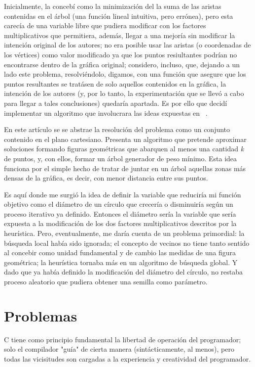 \documentclass[a4paper]{report}
\begin{document}
  Inicialmente, la conceb\'i como la minimizaci\'on del la suma de las aristas contenidas en el
  \'arbol (una funci\'on lineal intuitiva, pero err\'onea), pero esta carec\'ia de una variable
  libre que pudiera modificar con los factores multiplicativos que permitiera, adem\'as, llegar
  a una mejor\'ia sin modificar la intenci\'on original de los autores; no era posible usar las
  aristas (o coordenadas de los v\'ertices) como valor modificado ya que los puntos resiultantes
  podr\'ian no encontrarse dentro de la gr\'afica original; considero, incluso, que, dejando a
  un lado este problema, resolvi\'endolo, digamos, con una funci\'on que asegure que los puntos
  resultantes se trat\'asen de solo aquellos contenidos en la gr\'afica, la intenci\'on de los
  autores (y, por lo tanto, la experimentaci\'on que se llev\'o a cabo para llegar a tales
  conclusiones) quedar\'ia apartada. Es por ello que decid\'i implementar un algoritmo que
  involucrara las ideas expuestas en ~\cite{ravi}.

  En este art\'iculo se se abstrae la resoluci\'on del problema como un conjunto contenido en el
  plano cartesiano. Presenta un algoritmo que pretende aproximar soluciones formando figuras geom\'etricas
  que abarquen al menos una cantidad \textit{k} de puntos, y, con ellos, formar un \'arbol generador
  de peso m\'inimo. Esta idea funciona por el simple hecho de tratar de juntar en un \'arbol aquellas zonas
  m\'as densas de la gr\'afica, es decir, con menor distancia entre sus puntos.

  Es aqu\'i donde me surgi\'o la idea de definir la variable que reducir\'ia mi funci\'on objetivo como
  el di\'ametro de un c\'irculo que crecer\'ia o disminuir\'ia seg\'un un proceso iterativo ya definido.
  Entonces el di\'ametro ser\'ia la variable que ser\'ia expuesta a la modificaci\'on de los dos factores
  multiplicativos descritos por la heur\'istica. Pero, eventualmente, me dar\'ia cuenta de un problema
  primordial: la b\'usqueda local hab\'ia sido ignorada; el concepto de vecinos no tiene tanto sentido
  al concebir como unidad fundamental y de cambio las medidas de una figura geom\'etrica; la heur\'istica
  tornaba m\'as en un algoritmo de b\'usqueda global. Y dado que ya hab\'ia definido la modificaci\'on del
  di\'ametro del c\'irculo, no restaba proceso aleatorio que pudiera obtener una semilla como par\'ametro.

  \section{Problemas}
  C tiene como principio fundamental la libertad de operaci\'on del programador; solo el
  compilador "gu\'ia" de cierta manera (sint\'acticamente, al menos), pero todas las
  vicisitudes son cargadas a la experiencia y creatividad del programador.
\end{document}
